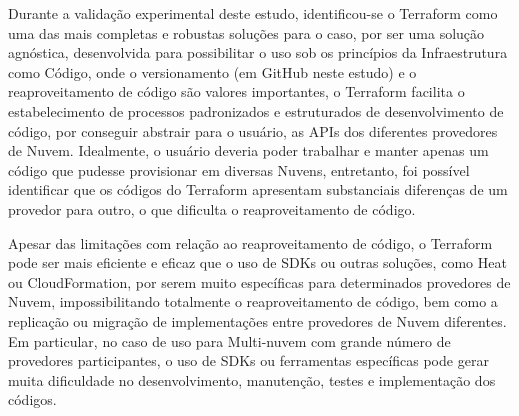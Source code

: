 \documentclass[12pt]{article}
\begin{document}
	Durante a validação experimental deste estudo, identificou-se o Terraform como uma das mais completas e robustas soluções para o caso, por ser uma solução agnóstica, desenvolvida para possibilitar o uso sob os princípios da Infraestrutura como Código, onde o versionamento (em GitHub neste estudo) e o reaproveitamento de código são valores importantes, o Terraform facilita o estabelecimento de processos padronizados e estruturados de desenvolvimento de código, por conseguir abstrair para o usuário, as APIs dos diferentes provedores de Nuvem. Idealmente, o usuário deveria poder trabalhar e manter apenas um código que pudesse provisionar em diversas Nuvens, entretanto, foi possível identificar que os códigos do Terraform apresentam substanciais diferenças de um provedor para outro, o que dificulta o reaproveitamento de código. 
	
	Apesar das limitações com relação ao reaproveitamento de código, o Terraform pode ser mais eficiente e eficaz que o uso de SDKs ou outras soluções, como Heat ou CloudFormation, por serem muito específicas para determinados provedores de Nuvem, impossibilitando totalmente o reaproveitamento de código, bem como a replicação ou migração de implementações entre provedores de Nuvem diferentes. Em particular, no caso de uso para Multi-nuvem com grande número de provedores participantes, o uso de SDKs ou ferramentas específicas pode gerar muita dificuldade no desenvolvimento, manutenção, testes e implementação dos códigos.
	
	
	\nocite{Bond:2015}
	
	\newpage

		
	
	
\end{document}
